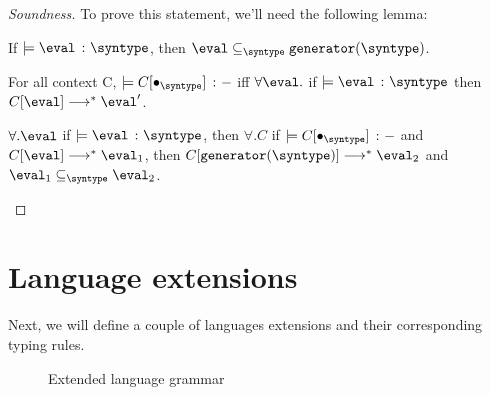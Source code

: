 \begin{proof}[Soundness]
  To prove this statement, we'll need the following lemma:

  \begin{lemma}
    If $\models \hastype{\eval}{\syntype}$, then $\eval \subseteq_{\syntype} \mkgen{\syntype}$.
  \end{lemma}

  \begin{definition}
    For all context C, $\models \hastype{C[\bullet_{\syntype}]}{-}$ iff $\forall \eval.$ if $\models \hastype{\eval}{\syntype}$ then $C[\eval] \smallsteps[] \eval'$.
  \end{definition}

  \begin{lemma}
    $\forall. \eval$ if $\models \hastype{\eval}{\syntype}$, then $\forall. C$ if $\models \hastype{C[\bullet_{\syntype}]}{-}$ and $C[\eval] \smallsteps[] \eval_1$, then $C[\mkgen{\syntype}] \smallsteps[] \eval_2$ and $\eval_1 \subseteq_{\syntype} \eval_2$.
  \end{lemma}

\end{proof}

\section{Language extensions}

Next, we will define a couple of languages extensions and their corresponding typing rules.

\begin{figure}[hbt!]%
  \begin{grammar}
            \grule[expressions]{\expr}{
              \cdots
              \gor \vpoly
            }
            \grule[values]{\eval}{
              \cdots
              \gor \vpoly
            }
            \grule[types]{\syntype}{
              \cdots
              \gor \tpoly
              \gor \mkunion{\syntype}{\syntype}
              \gor \mkintersect{\syntype}{\syntype}
              \gor \mktset{\syntype}{\expr}
              \gor \mkdfun{\ev}{\syntype}{\syntype}
              \gor \mkmiu{\alpha}{\syntype}
          }
        \end{grammar}
    \caption{Extended language grammar}
    \label{ext_Grammar}
\end{figure}

